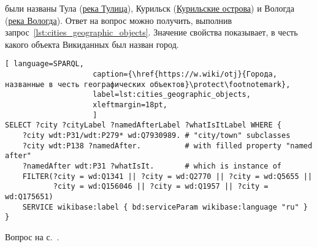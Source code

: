 \begin{task}
    \label{answer:cities_geographic_objects}
     были названы 
    Тула (\href{https://w.wiki/oLJ}{река Тулица}), 
    Курильск (\href{https://w.wiki/oLH}{Курильские острова}) 
    и Вологда (\href{https://w.wiki/oLG}{река Вологда}). 
    Ответ на вопрос можно получить, выполнив запрос~\ref{lst:cities_geographic_objects}. 
    Значение свойства  
    показывает, в честь какого объекта Викиданных был назван город.
   
\begin{lstlisting}[ language=SPARQL, 
                    caption={\href{https://w.wiki/otj}{Города, названные в честь географических объектов}\protect\footnotemark},
                    label=lst:cities_geographic_objects,
                    xleftmargin=18pt, 
                    ]
SELECT ?city ?cityLabel ?namedAfterLabel ?whatIsItLabel WHERE {
    ?city wdt:P31/wdt:P279* wd:Q7930989. # "city/town" subclasses
    ?city wdt:P138 ?namedAfter.          # with filled property "named after"
    ?namedAfter wdt:P31 ?whatIsIt.       # which is instance of
    FILTER(?city = wd:Q1341 || ?city = wd:Q2770 || ?city = wd:Q5655 ||
           ?city = wd:Q156046 || ?city = wd:Q1957 || ?city = wd:Q175651)
    SERVICE wikibase:label { bd:serviceParam wikibase:language "ru" }
}
\end{lstlisting}%
    \small{\AnswerBackref Вопрос на с.~\pageref{lst:population_town}.}
\end{task}

